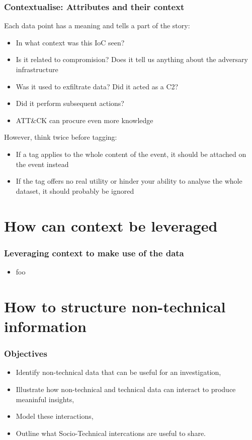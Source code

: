 \begin{frame}
    \frametitle{Contextualise: Attributes and their context}
    Each data point has a meaning and tells a part of the story:
    \begin{itemize}
        \item In what context was this IoC seen?
        \item Is it related to compromision? Does it tell us anything about the adversary infrastructure
        \item Was it used to exfiltrate data? Did it acted as a C2?
        \item Did it perform subsequent actions?
        \item ATT&CK can procure even more knowledge
    \end{itemize}

    However, think twice before tagging:
    \begin{itemize}
        \item If a tag applies to the whole content of the event, it should be attached on the event instead
        \item If the tag offers no real utility or hinder your ability to analyse the whole dataset, it should probably be ignored
    \end{itemize}
\end{frame}

\section{How can context be leveraged}
\begin{frame}
    \frametitle{Leveraging context to make use of the data}
    \begin{itemize}
        \item foo
    \end{itemize}
\end{frame}


\section{How to structure non-technical information}
\begin{frame}
    \frametitle{Objectives}
    \begin{itemize}
        \item Identify non-technical data that can be useful for an investigation,
        \item Illustrate how non-technical and technical data can interact to produce meaninful insights,
        \item Model these interactions,
        \item Outline what Socio-Technical intercations are useful to share.
    \end{itemize}

\end{frame}


